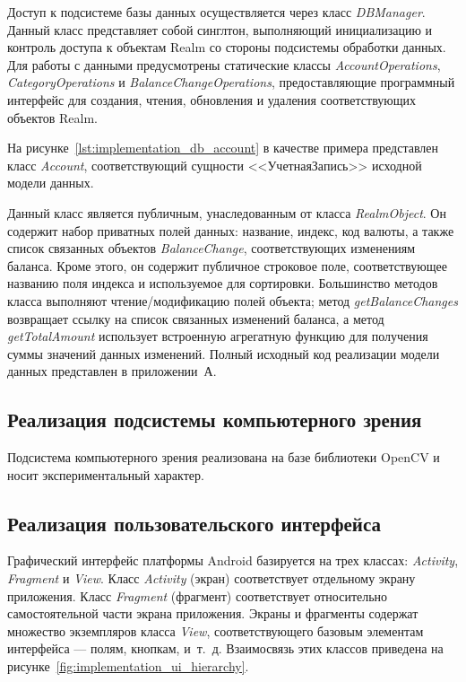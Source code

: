 Доступ к подсистеме базы данных осуществляется через класс
\textit{DBManager}. Данный класс представляет собой синглтон,
выполняющий инициализацию и контроль доступа к объектам Realm
со стороны подсистемы обработки данных.
Для работы с данными предусмотрены статические классы
\textit{AccountOperations}, \textit{CategoryOperations}
и \textit{BalanceChangeOperations}, предоставляющие
программный интерфейс для создания, чтения, обновления и
удаления соответствующих объектов Realm.

На рисунке~\ref{lst:implementation_db_account} в качестве примера
представлен класс \textit{Account}, соответствующий сущности <<УчетнаяЗапись>>
исходной модели данных.



Данный класс является публичным, унаследованным от класса \textit{RealmObject}.
Он содержит набор приватных полей данных: название, индекс, код валюты,
а также список связанных объектов \textit{BalanceChange},
соответствующих изменениям баланса.
Кроме этого, он содержит публичное строковое поле, соответствующее
названию поля индекса и используемое для сортировки.
Большинство методов класса выполняют чтение/модификацию
полей объекта; метод \textit{getBalanceChanges} возвращает ссылку на
список связанных изменений баланса,
а метод \textit{getTotalAmount} использует встроенную
агрегатную функцию для получения суммы значений данных изменений.
Полный исходный код реализации модели данных представлен в приложении~А.

\subsection{Реализация подсистемы компьютерного зрения}
\label{subsec:implementation_cv}

Подсистема компьютерного зрения реализована на базе библиотеки
OpenCV и носит экспериментальный характер.

\subsection{Реализация пользовательского интерфейса}
\label{subsec:implementation_ui}

Графический интерфейс платформы Android базируется на трех классах:
\textit{Activity}, \textit{Fragment} и \textit{View}.
Класс \textit{Activity} (экран) соответствует отдельному экрану приложения.
Класс \textit{Fragment} (фрагмент) соответствует относительно самостоятельной части
экрана приложения.
Экраны и фрагменты содержат множество экземпляров класса \textit{View},
соответствующего базовым элементам интерфейса --- полям, кнопкам, и~т.~д.
Взаимосвязь этих классов приведена на рисунке~\ref{fig:implementation_ui_hierarchy}.

